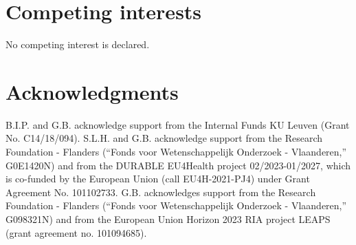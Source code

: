 \section*{Competing interests}
No competing interest is declared.




\section*{Acknowledgments}
B.I.P. and G.B. acknowledge support from the Internal Funds KU Leuven (Grant No. C14/18/094).
S.L.H. and G.B. acknowledge support from the Research Foundation - Flanders (``Fonds voor Wetenschappelijk Onderzoek - Vlaanderen,'' G0E1420N) and from the DURABLE EU4Health project 02/2023-01/2027, which is co-funded by the European Union (call EU4H-2021-PJ4) under Grant Agreement No. 101102733.
G.B. acknowledges support from the Research Foundation - Flanders (``Fonds voor Wetenschappelijk Onderzoek - Vlaanderen,'' G098321N) and from the European Union Horizon 2023 RIA project LEAPS (grant agreement no. 101094685).



\cleardoublepage

